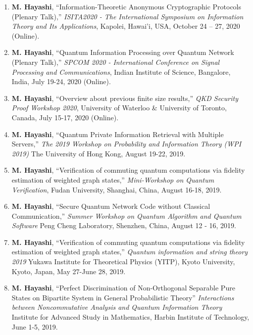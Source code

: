 \documentclass[a4paper,12pt,oneside]{article}
\begin{document}
\begin{enumerate}
\item 
\textbf{M. Hayashi}, 
``Information-Theoretic Anonymous Cryptographic Protocols (Plenary Talk),'' 
{\em  ISITA2020 - The International Symposium on Information Theory and Its Applications}, 
Kapolei, Hawai’i, USA, October 24 -- 27, 2020 (Online). 

\item 
\textbf{M. Hayashi}, 
``Quantum Information Processing over Quantum Network (Plenary Talk),'' 
{\em  SPCOM 2020 - International Conference on Signal Processing and Communications}, 
Indian Institute of Science, Bangalore, India, July 19-24, 2020 (Online). 

\item 
\textbf{M. Hayashi}, 
``Overview about previous finite size results,''
{\em  QKD Security Proof Workshop 2020}, 
University of Waterloo \& University of Toronto,
Canada, July 15-17, 2020 (Online). 

\item 
\textbf{M. Hayashi}, 
``Quantum Private Information Retrieval with Multiple Servers,''
{\em  The 2019 Workshop on Probability and Information Theory (WPI 2019)}
The University of Hong Kong, 
August 19-22, 2019. 

\item 
\textbf{M. Hayashi}, 
``Verification of commuting quantum computations via fidelity estimation of weighted graph states,''
{\em Mini-Workshop on Quantum Verification}, 
Fudan University, Shanghai, China,
August 16-18, 2019.

\item 
\textbf{M. Hayashi}, 
``Secure Quantum Network Code without Classical Communication,''
{\em  Summer Workshop on Quantum Algorithm and Quantum Software}
Peng Cheng Laboratory, Shenzhen, China,
August 12 - 16, 2019.

\item 
\textbf{M. Hayashi}, 
``Verification of commuting quantum computations via fidelity estimation of weighted graph states,''
{\em  Quantum information and string theory 2019}
Yukawa Institute for Theoretical Physics (YITP), Kyoto University, Kyoto, Japan,
May 27-June 28, 2019.

\item 
\textbf{M. Hayashi}, 
``Perfect Discrimination of Non-Orthogonal Separable Pure States on Bipartite System in General Probabilistic Theory''
{\em  Interactions between Noncommutative Analysis and Quantum Information Theory}
Institute for Advanced Study in Mathematics, Harbin Institute of Technology,
June 1-5, 2019.


\end{enumerate}
\end{document}
